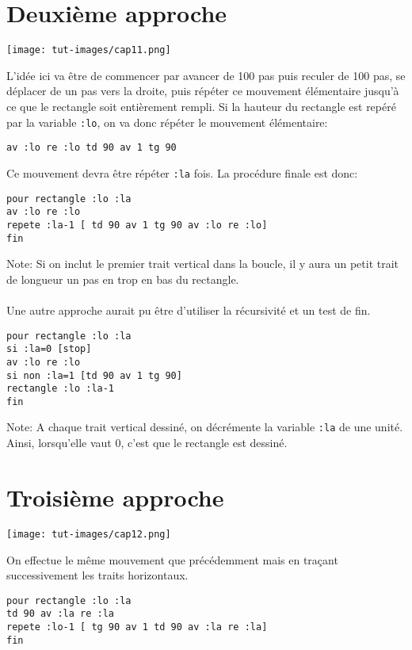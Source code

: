 \section{Deuxième approche}
\begin{center}
\texttt{[image: tut-images/cap11.png]}
\end{center}

\noindent L'idée ici va être de commencer par avancer de 100 pas puis reculer de 100 pas, se déplacer de un pas vers la droite, puis répéter ce mouvement élémentaire jusqu'à ce que le rectangle soit entièrement rempli.
Si la hauteur du rectangle est repéré par la variable \texttt{:lo}, on va donc répéter le mouvement élémentaire:
\begin{verbatim}
av :lo re :lo td 90 av 1 tg 90
\end{verbatim}
Ce mouvement devra être répéter \texttt{:la} fois. La procédure finale est donc:
\begin{verbatim}
pour rectangle :lo :la
av :lo re :lo
repete :la-1 [ td 90 av 1 tg 90 av :lo re :lo]
fin
\end{verbatim}
Note: Si on inclut le premier trait vertical dans la boucle, il y aura un petit trait de longueur un pas en trop en bas du rectangle.\\ \\
Une autre approche aurait pu être d'utiliser la récursivité et un test de fin.
\begin{verbatim}
pour rectangle :lo :la
si :la=0 [stop]
av :lo re :lo 
si non :la=1 [td 90 av 1 tg 90]
rectangle :lo :la-1
fin
\end{verbatim}
Note: A chaque trait vertical dessiné, on décrémente la variable \texttt{:la} de une unité. Ainsi, lorsqu'elle vaut 0, c'est que le rectangle est dessiné.
\section{Troisième approche}
\begin{center}
\texttt{[image: tut-images/cap12.png]}
\end{center}

\noindent On effectue le même mouvement que précédemment mais en traçant successivement les traits horizontaux.
\begin{verbatim}
pour rectangle :lo :la
td 90 av :la re :la
repete :lo-1 [ tg 90 av 1 td 90 av :la re :la]
fin
\end{verbatim}